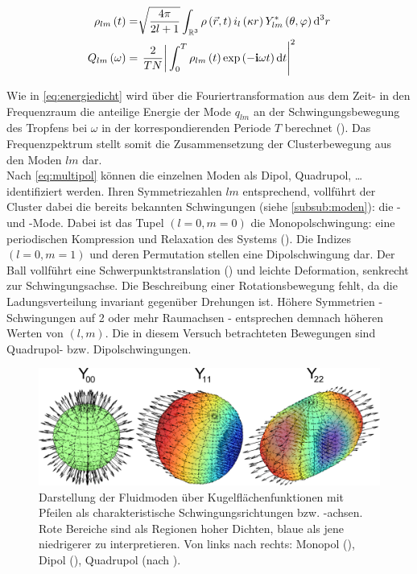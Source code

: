           \begin{align}
            \rho_{lm}\left(t\right)=&\sqrt{\frac{4\pi}{2l+1}}\int_{\mathbb{R}^{3}}\rho\left(\vec{r},t\right)i_{l}\left(\kappa r\right)Y^{*}_{lm}\left(\theta,\varphi\right)\textnormal{d}^{3}r \label{eq:multipol} \\
            Q_{lm}\left(\omega\right)=&\left.\left.\frac{2}{TN}\right|\int_{0}^{T}\rho_{lm}\left(t\right)\exp\left(-\mathbf{i}\omega t\right)\textnormal{d} t\right|^{2}
          \end{align}

        Wie in \autoref{eq:energiedicht} wird \"uber die Fouriertransformation aus dem Zeit- in den Frequenzraum die anteilige Energie der Mode $q_{lm}$ an der Schwingungsbewegung des Tropfens bei $\omega$ in der korrespondierenden Periode  $T$ berechnet (\cite{Schella13}). Das Frequenzpektrum stellt somit die Zusammensetzung der Clusterbewegung aus den Moden $lm$ dar.\\
        Nach \autoref{eq:multipol} k\"onnen die einzelnen Moden als Dipol, Quadrupol, \dots identifiziert werden. Ihren Symmetriezahlen $lm$ entsprechend, vollf\"uhrt der Cluster dabei die bereits bekannten Schwingungen (siehe \ref{subsub:moden}): die - und -Mode. Dabei ist das Tupel $\left(l=0,m=0\right)$ die Monopolschwingung: eine periodischen Kompression und Relaxation des Systems (). Die Indizes $\left(l=0,m=1\right)$ und deren Permutation stellen eine Dipolschwingung dar. Der Ball vollf\"uhrt eine Schwerpunktstranslation () und leichte Deformation, senkrecht zur Schwingungsachse. Die Beschreibung einer Rotationsbewegung fehlt, da die Ladungsverteilung invariant gegen\"uber Drehungen ist. H\"ohere Symmetrien - Schwingungen auf 2 oder mehr Raumachsen - entsprechen demnach h\"oheren Werten von $\left(l,m\right)$. Die in diesem Versuch betrachteten Bewegungen sind Quadrupol- bzw. Dipolschwingungen.

          \begin{figure}[H]
                          \centering
                          \includegraphics[width=\textwidth,height=0.375\textwidth]{figs/y001122.png}
                          \caption{Darstellung der Fluidmoden über Kugelflächenfunktionen mit Pfeilen als charakteristische Schwingungsrichtungen bzw. -achsen. Rote Bereiche sind als Regionen hoher Dichten, blaue als jene niedrigerer zu interpretieren. Von links nach rechts: Monopol (), Dipol (), Quadrupol (nach \cite{Mulsow13}).}
                          \label{img:fluidmode}
                      \end{figure}


